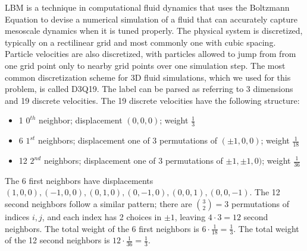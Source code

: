 \documentclass[11pt]{article} %
\begin{document}
LBM is a technique in computational fluid dynamics that uses the Boltzmann Equation
to devise a numerical simulation of a fluid that can accurately capture mesoscale dynamics
when it is tuned properly.
The physical system is discretized, typically on a rectilinear grid 
and most commonly one with cubic spacing.  
Particle velocities are also discretized, with particles allowed to jump from
from one grid point only to nearby grid points over one simulation step.
The most common discretization scheme for 3D fluid simulations,
which we used for this problem, is called D3Q19.
The label can be parsed as referring to 3 dimensions and 19 discrete velocities.
The 19 discrete velocities have the following structure:
\begin{itemize}
\item 1 $0^{th}$ neighbor; displacement $(0,0,0)$; weight $\frac{1}{3}$
\item 6 $1^{st}$ neighbors; displacement one of 3 permutations of $(\pm 1, 0, 0)$; weight $\frac{1}{18}$
\item 12 $2^{nd}$ neighbors; displacement one of 3 permutations of $\pm 1, \pm 1, 0)$; weight $\frac{1}{36}$
\end{itemize}
The 6 first neighbors have displacements $(1,0,0), (-1,0,0), (0,1,0), (0,-1,0), (0,0,1), (0,0,-1)$.
The 12 second neighbors follow a similar pattern; there are ${3 \choose 2} = 3$ permutations of indices
$i, j$, and each index has 2 choices in $\pm1$, leaving $4 \cdot 3 = 12$ second neighbors.
The total weight of the 6 first neighbors is $6 \cdot \frac{1}{18} = \frac{1}{3}$.
The total weight of the 12 second neighbors is $12 \cdot \frac{1}{36} = \frac{1}{3}$.
\end{document}

